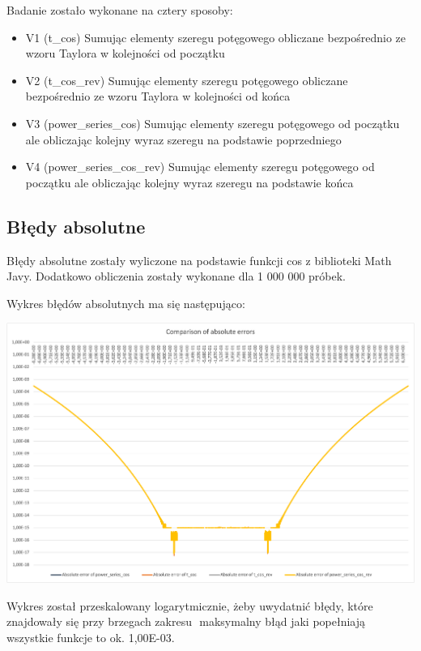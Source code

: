 \documentclass{article}
\begin{document}
Badanie zostało wykonane na cztery sposoby:

\begin{itemize}
\item V1 (t\_cos) Sumując elementy szeregu potęgowego obliczane bezpośrednio ze wzoru Taylora w kolejności od początku
\item V2 (t\_cos\_rev) Sumując elementy szeregu potęgowego obliczane bezpośrednio ze wzoru Taylora w kolejności od końca
\item V3 (power\_series\_cos) Sumując elementy szeregu potęgowego od początku ale obliczając kolejny wyraz szeregu na podstawie poprzedniego
\item V4 (power\_series\_cos\_rev) Sumując elementy szeregu potęgowego od początku ale obliczając kolejny wyraz szeregu na podstawie końca
\end{itemize}

\subsection{Błędy absolutne}

Błędy absolutne zostały wyliczone na podstawie funkcji cos z biblioteki Math Javy. Dodatkowo obliczenia zostały wykonane dla 1 000 000 próbek.

\centerline{Wykres błędów absolutnych ma się następująco:}

\hspace{0.5cm}

\centerline{\includegraphics[scale=0.50]{comparison.png}}

\hspace{0.5cm}

Wykres został przeskalowany logarytmicznie, żeby uwydatnić błędy, które znajdowały się przy brzegach zakresu \begin{math}[-2\pi; 2\pi]\end{math} maksymalny błąd jaki popełniają wszystkie funkcje to ok. 1,00E-03.
\end{document}
